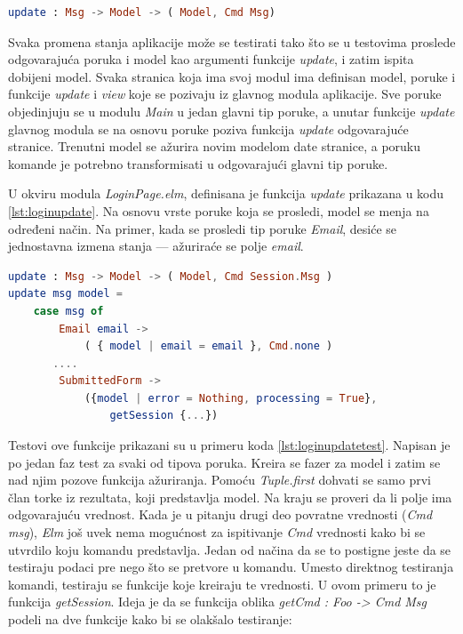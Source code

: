 \documentclass[12pt,oneside]{memoir}
\begin{document}
\begin{minipage}{\linewidth}
\begin{lstlisting}[language=elm, basicstyle=\small, caption={Anotacija funkcije \emph{update}},captionpos=b, label={lst:updateanotacija}]
		update : Msg -> Model -> ( Model, Cmd Msg)
\end{lstlisting}
\end{minipage}

\par Svaka promena stanja aplikacije može se testirati tako što se u testovima proslede odgovarajuća poruka i model kao argumenti funkcije \emph{update}, i zatim ispita dobijeni model. Svaka stranica koja ima svoj modul ima definisan model, poruke i funkcije \emph{update} i \emph{view} koje se pozivaju iz glavnog modula aplikacije. Sve poruke objedinjuju se u modulu \emph{Main} u jedan glavni tip poruke, a unutar funkcije \emph{update} glavnog modula se na osnovu poruke poziva funkcija \emph{update} odgovarajuće stranice. Trenutni model se ažurira novim modelom date stranice, a poruku komande je potrebno transformisati u odgovarajući glavni tip poruke.
\par U okviru modula \emph{LoginPage.elm}, definisana je funkcija \emph{update} prikazana u kodu \ref{lst:loginupdate}. Na osnovu vrste poruke koja se prosledi, model se menja na određeni način. Na primer, kada se prosledi tip poruke \emph{Email}, desiće se jednostavna izmena stanja --- ažuriraće se polje \emph{email}.

\begin{minipage}{\linewidth}
\begin{lstlisting}[language=elm, basicstyle=\small, caption={Funkcija \emph{update} stranice za prijavljivanje korisnika \emph{LoginPage}},captionpos=b, label={lst:loginupdate}]
update : Msg -> Model -> ( Model, Cmd Session.Msg )
update msg model =
    case msg of
        Email email ->
            ( { model | email = email }, Cmd.none )
       .... 
        SubmittedForm ->
            ({model | error = Nothing, processing = True}, 
            	getSession {...})
\end{lstlisting}
\end{minipage}

\par Testovi ove funkcije prikazani su u primeru koda \ref{lst:loginupdatetest}. Napisan je po jedan faz test za svaki od tipova poruka. Kreira se fazer za model i zatim se nad njim pozove funkcija ažuriranja. Pomoću \emph{Tuple.first} dohvati se samo prvi član torke iz rezultata, koji predstavlja model. Na kraju se proveri da li polje ima odgovarajuću vrednost. Kada je u pitanju drugi deo povratne vrednosti (\emph{Cmd msg}), \emph{Elm} još uvek nema mogućnost za ispitivanje \emph{Cmd} vrednosti kako bi se utvrdilo koju komandu predstavlja. Jedan od načina da se to postigne jeste da se testiraju podaci pre nego što se pretvore u komandu. Umesto direktnog testiranja komandi, testiraju se funkcije koje kreiraju te vrednosti. U ovom primeru to je funkcija \emph{getSession}. Ideja je da se funkcija oblika \emph{getCmd : Foo -> Cmd Msg} podeli na dve funkcije kako bi se olakšalo testiranje: 
\end{document}
